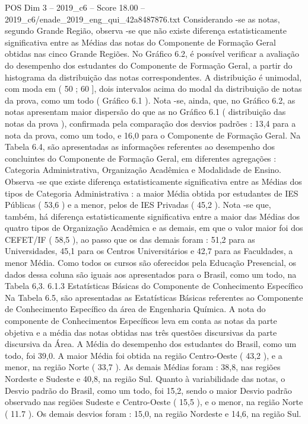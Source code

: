 \begin{textsample}{POS Dim 3 – 2019\_c6 – Score 18.00 – 2019\_c6/enade\_2019\_eng\_qui\_42a8487876.txt}
Considerando -se as notas, segundo Grande Região, observa -se que não existe diferença estatisticamente significativa entre as Médias das notas do Componente de Formação Geral obtidas nas cinco Grande Regiões.
No Gráfico 6.2, é possível verificar a avaliação do desempenho dos estudantes do Componente de Formação Geral, a partir do histograma da distribuição das notas correspondentes.
A distribuição é unimodal, com moda em ( 50 ; 60 ], dois intervalos acima do modal da distribuição de notas da prova, como um todo ( Gráfico 6.1 ).
Nota -se, ainda, que, no Gráfico 6.2, as notas apresentam maior dispersão do que as no Gráfico 6.1 ( distribuição das notas da prova ), confirmada pela comparação dos desvios padrões : 13,4 para a nota da prova, como um todo, e 16,0 para o Componente de Formação Geral.
Na Tabela 6.4, são apresentadas as informações referentes ao desempenho dos concluintes do Componente de Formação Geral, em diferentes agregações : Categoria Administrativa, Organização Acadêmica e Modalidade de Ensino.
Observa -se que existe diferença estatisticamente significativa entre as Médias dos tipos de Categoria Administrativa : a maior Média obtida por estudantes de IES Públicas ( 53,6 ) e a menor, pelos de IES Privadas ( 45,2 ).
Nota -se que, também, há diferença estatisticamente significativa entre a maior das Médias dos quatro tipos de Organização Acadêmica e as demais, em que o valor maior foi dos CEFET/IF ( 58,5 ), ao passo que os das demais foram : 51,2 para as Universidades, 45,1 para os Centros Universitários e 42,7 para as Faculdades, a menor Média.
Como todos os cursos são oferecidos pela Educação Presencial, os dados dessa coluna são iguais aos apresentados para o Brasil, como um todo, na Tabela 6,3. 6.1.3 Estatísticas Básicas do Componente de Conhecimento Específico Na Tabela 6.5, são apresentadas as Estatísticas Básicas referentes ao Componente de Conhecimento Específico da área de Engenharia Química.
A nota do componente de Conhecimentos Específicos leva em conta as notas da parte objetiva e a média das notas obtidas nas três questões discursivas da parte discursiva da Área.
A Média do desempenho dos estudantes do Brasil, como um todo, foi 39,0.
A maior Média foi obtida na região Centro-Oeste ( 43,2 ), e a menor, na região Norte ( 33,7 ).
As demais Médias foram : 38,8, nas regiões Nordeste e Sudeste e 40,8, na região Sul.
Quanto à variabilidade das notas, o Desvio padrão do Brasil, como um todo, foi 15,2, sendo o maior Desvio padrão observado nas regiões Sudeste e Centro-Oeste ( 15,5 ), e o menor, na região Norte ( 11.7 ).
Os demais desvios foram : 15,0, na região Nordeste e 14,6, na região Sul.

\end{textsample}
